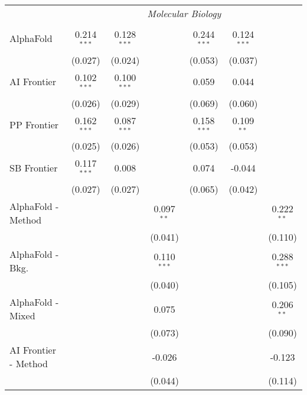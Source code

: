 \begin{tabular}{lcccccc}
 & \multicolumn{6}{c}{\textit{Molecular Biology}} \\ \\
   AlphaFold            & 0.214$^{***}$ & 0.128$^{***}$ &               & 0.244$^{***}$ & 0.124$^{***}$ &   \\   
                        & (0.027)       & (0.024)       &               & (0.053)       & (0.037)       &   \\   
   AI Frontier          & 0.102$^{***}$ & 0.100$^{***}$ &               & 0.059         & 0.044         &   \\   
                        & (0.026)       & (0.029)       &               & (0.069)       & (0.060)       &   \\   
   PP Frontier          & 0.162$^{***}$ & 0.087$^{***}$ &               & 0.158$^{***}$ & 0.109$^{**}$  &   \\   
                        & (0.025)       & (0.026)       &               & (0.053)       & (0.053)       &   \\   
   SB Frontier          & 0.117$^{***}$ & 0.008         &               & 0.074         & -0.044        &   \\   
                        & (0.027)       & (0.027)       &               & (0.065)       & (0.042)       &   \\   
   AlphaFold - Method   &               &               & 0.097$^{**}$  &               &               & 0.222$^{**}$\\   
                        &               &               & (0.041)       &               &               & (0.110)\\   
   AlphaFold - Bkg.     &               &               & 0.110$^{***}$ &               &               & 0.288$^{***}$\\   
                        &               &               & (0.040)       &               &               & (0.105)\\   
   AlphaFold - Mixed    &               &               & 0.075         &               &               & 0.206$^{**}$\\   
                        &               &               & (0.073)       &               &               & (0.090)\\   
   AI Frontier - Method &               &               & -0.026        &               &               & -0.123\\   
                        &               &               & (0.044)       &               &               & (0.114)\\   

\end{tabular}
